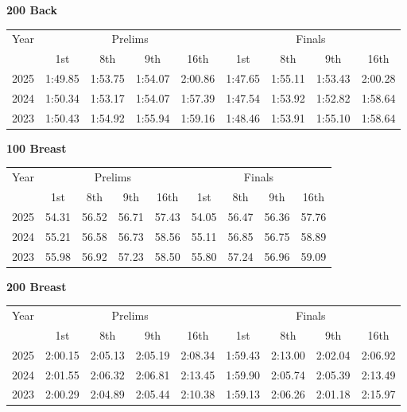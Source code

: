 \textbf{200 Back}

\begin{flushleft}
\begin{tabular}{|c|c|c|c|c|c|c|c|c|}
\hline
Year & \multicolumn{4}{c|}{Prelims} & \multicolumn{4}{c|}{Finals} \\
\cline{2-9}
& 1st & 8th & 9th & 16th & 1st & 8th & 9th & 16th \\
\hline
2025 & 1:49.85 & 1:53.75 & 1:54.07 & 2:00.86 & 1:47.65 & 1:55.11 & 1:53.43 & 2:00.28 \\
2024 & 1:50.34 & 1:53.17 & 1:54.07 & 1:57.39 & 1:47.54 & 1:53.92 & 1:52.82 & 1:58.64 \\
2023 & 1:50.43 & 1:54.92 & 1:55.94 & 1:59.16 & 1:48.46 & 1:53.91 & 1:55.10 & 1:58.64 \\
\hline
\end{tabular}
\end{flushleft}

\clearpage
\textbf{100 Breast}

\begin{flushleft}
\begin{tabular}{|c|c|c|c|c|c|c|c|c|}
\hline
Year & \multicolumn{4}{c|}{Prelims} & \multicolumn{4}{c|}{Finals} \\
\cline{2-9}
& 1st & 8th & 9th & 16th & 1st & 8th & 9th & 16th \\
\hline
2025 & 54.31 & 56.52 & 56.71 & 57.43 & 54.05 & 56.47 & 56.36 & 57.76 \\
2024 & 55.21 & 56.58 & 56.73 & 58.56 & 55.11 & 56.85 & 56.75 & 58.89 \\
2023 & 55.98 & 56.92 & 57.23 & 58.50 & 55.80 & 57.24 & 56.96 & 59.09 \\
\hline
\end{tabular}
\end{flushleft}

\textbf{200 Breast}

\begin{flushleft}
\begin{tabular}{|c|c|c|c|c|c|c|c|c|}
\hline
Year & \multicolumn{4}{c|}{Prelims} & \multicolumn{4}{c|}{Finals} \\
\cline{2-9}
& 1st & 8th & 9th & 16th & 1st & 8th & 9th & 16th \\
\hline
2025 & 2:00.15 & 2:05.13 & 2:05.19 & 2:08.34 & 1:59.43 & 2:13.00 & 2:02.04 & 2:06.92 \\
2024 & 2:01.55 & 2:06.32 & 2:06.81 & 2:13.45 & 1:59.90 & 2:05.74  & 2:05.39  & 2:13.49 \\
2023 & 2:00.29 & 2:04.89 & 2:05.44 & 2:10.38 & 1:59.13 & 2:06.26 & 2:01.18 & 2:15.97 \\
\hline
\end{tabular}
\end{flushleft}

